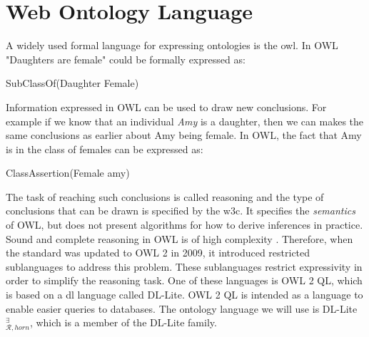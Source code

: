 \section{Web Ontology Language}
A widely used formal language for expressing ontologies is the \gls{owl}. In OWL "Daughters are female" could be formally expressed as:

\centerline{\textsf{SubClassOf(Daughter Female)}}
Information expressed in OWL can be used to draw new conclusions. For example if we know that an individual \emph{Amy} is a daughter, then we can makes the same conclusions as earlier about Amy being female. In OWL, the fact that Amy is in the class of females can be expressed as:

\centerline{\textsf{ClassAssertion(Female amy)}}
The task of reaching such conclusions is called reasoning and the type of conclusions that can be drawn is specified by the \gls{w3c}. It specifies the \emph{semantics} of OWL, but does not present algorithms for how to derive inferences in practice. Sound and complete reasoning in OWL is of high complexity \cite{Krotzsch2012}. Therefore, when the standard was updated to OWL 2 in 2009, it introduced restricted sublanguages to address this problem. These sublanguages restrict expressivity in order to simplify the reasoning task. One of these languages is OWL 2 QL, which is based on a \gls{dl} language called DL-Lite. OWL 2 QL is intended as a language to enable easier queries to databases. The ontology language we will use is DL-Lite$_{\mathcal{R}, horn}^{\exists}$, which is a member of the DL-Lite family.



